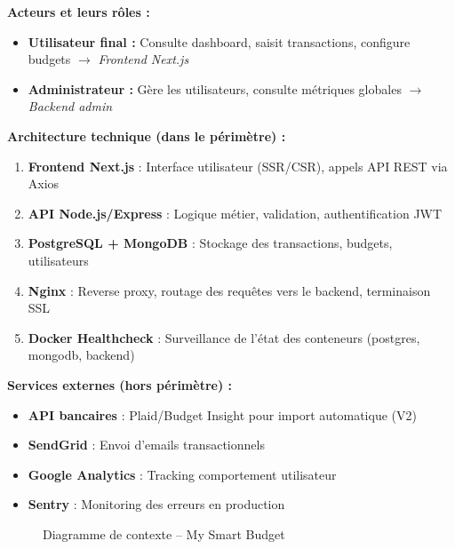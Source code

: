 \begin{tcolorbox}[colback=blue!5!white,colframe=blue!60!black,title=\textbf{Lecture du diagramme -- Architecture et flux}]
\textbf{Acteurs et leurs rôles :}
\begin{itemize}
    \item \textbf{Utilisateur final :} Consulte dashboard, saisit transactions, configure budgets $\rightarrow$ \textit{Frontend Next.js}
    \item \textbf{Administrateur :} Gère les utilisateurs, consulte métriques globales $\rightarrow$ \textit{Backend admin}

\end{itemize}

\textbf{Architecture technique (dans le périmètre) :}
\begin{enumerate}
    \item \textbf{Frontend Next.js} : Interface utilisateur (SSR/CSR), appels API REST via Axios
    \item \textbf{API Node.js/Express} : Logique métier, validation, authentification JWT
    \item \textbf{PostgreSQL + MongoDB} : Stockage des transactions, budgets, utilisateurs
    \item \textbf{Nginx} : Reverse proxy, routage des requêtes vers le backend, terminaison SSL
    \item \textbf{Docker Healthcheck} : Surveillance de l'état des conteneurs (postgres, mongodb, backend)
\end{enumerate}

\textbf{Services externes (hors périmètre) :}
\begin{itemize}
    \item \textbf{API bancaires} : Plaid/Budget Insight pour import automatique (V2)
    \item \textbf{SendGrid} : Envoi d'emails transactionnels
    \item \textbf{Google Analytics} : Tracking comportement utilisateur
    \item \textbf{Sentry} : Monitoring des erreurs en production
\end{itemize}
\end{tcolorbox}


\begin{figure}[H]
    \centering
    \caption{Diagramme de contexte -- My Smart Budget}
    \label{fig:diagramme_contexte}
\end{figure}

